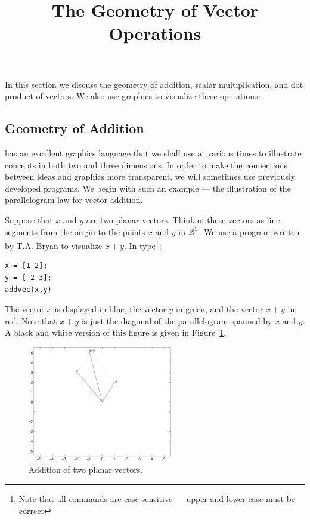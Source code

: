 \documentclass{ximera}
\title{The Geometry of Vector Operations}
\begin{document}
\begin{abstract}
\end{abstract}
\maketitle


\label{S:1.4}

In this section we discuss the geometry of addition, scalar
multiplication, and dot product of vectors.  We also use \Matlab
graphics to visualize these operations.


\subsection*{Geometry of Addition} 

\Matlab has an excellent graphics language that we shall use
at various times to illustrate concepts in both two and three
dimensions.  In order to make the connections between ideas and
graphics more transparent, we will sometimes use previously
developed \Matlab programs.  We begin with such an example ---
the illustration of the parallelogram law
for vector addition.

Suppose that $x$ and $y$ are two planar vectors.  Think of these
vectors as line segments from the origin to the points $x$ and
$y$ in $\mbox{$\mathbb{R}$}^2$. We use a program written by T.A. Bryan to
visualize $x+y$.  In \Matlab type\footnote{Note that all \Matlab
commands are case sensitive --- upper and lower case must be correct}:
\begin{verbatim}
x = [1 2];
y = [-2 3];
addvec(x,y)
\end{verbatim}  
The vector $x$ is displayed in blue, the vector $y$ in green,
and the vector $x+y$ in red.  Note that $x+y$ is just the diagonal
of the parallelogram spanned by $x$ and $y$.  A black and white
version of this figure is given in Figure~\ref{F:vec2}.

\begin{figure}[htb]
         \centerline{%
         \includegraphics[width=2.5in]{../figures/vec2.pdf}}
         \caption{Addition of two planar vectors.}
         \label{F:vec2}
\end{figure}
\end{document}
